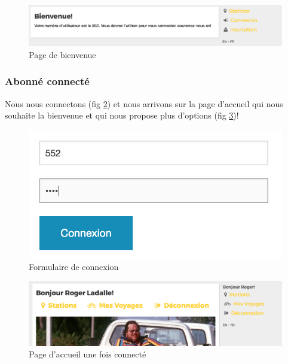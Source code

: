 \documentclass[a4paper]{article}
\begin{document}
    \begin{figure}
    \includegraphics[width=\textwidth]{images/s5.png}
    \caption{Page de bienvenue}
    \label{fig-s5}
    \end{figure}
    
    \subsubsection{Abonné connecté}
    Nous nous connectons (fig \ref{fig-s6}) et nous arrivons sur la page d'accueil qui nous souhaite la bienvenue et qui nous propose plus d'options (fig \ref{fig-s7})!
    
    \begin{figure}
    \begin{center}
    \includegraphics[width=\textwidth/3]{images/s6.png}
    \end{center}
    \caption{Formulaire de connexion}
    \label{fig-s6}
    \end{figure}
    
    \begin{figure}
    \includegraphics[width=\textwidth]{images/s7.png}
    \caption{Page d'accueil une fois connecté}
    \label{fig-s7}
    \end{figure}
    
\end{document}
